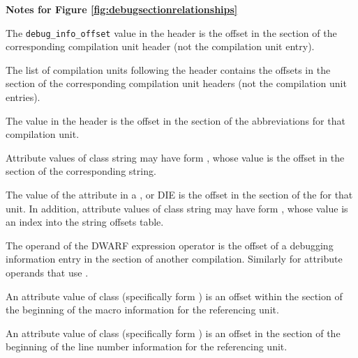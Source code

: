 \clearpage
\begin{center}
   \textbf{Notes for Figure \ref{fig:debugsectionrelationships}}
\end{center}
\begin{description} 
The \texttt{debug\_info\_offset} value in
the header is
the offset in the \dotdebuginfo{} section of the
corresponding compilation unit header (not the compilation
unit entry).

The list of compilation units following the header contains the offsets in the
\dotdebuginfo{} section of the 
corresponding compilation unit headers (not
the compilation unit entries). 

The \HFNdebugabbrevoffset{} value in the header is the offset in the
\dotdebugabbrev{} 
section of the abbreviations for that compilation unit.

Attribute values of class string may have form 
\DWFORMstrp, whose
value is the offset in the \dotdebugstr{}
section of the corresponding string.

The value of the \DWATstroffsetsbase{} attribute in a
\DWTAGcompileunit{}, \DWTAGtypeunit{} or \DWTAGpartialunit{} 
DIE is the offset in the
\dotdebugstroffsets{} section of the 
for that unit.
In addition, attribute values of class string may have form 
\DWFORMstrx, whose value is an index into the
string offsets table.

The operand of the \DWOPcallref{} 
DWARF expression operator is the
offset of a debugging information entry in the 
\dotdebuginfo{} section of another compilation.
Similarly for attribute operands that use
\DWFORMrefaddr.

An attribute value of class 
 (specifically form
\DWFORMsecoffset) is an 
offset within the 
\dotdebugmacro{} section
of the beginning of the macro information for the referencing unit.

An attribute value of class 
 (specifically form
\DWFORMsecoffset) 
is an offset in the 
\dotdebugline{} section of the
beginning of the line number information for the referencing unit.


\end{description}
